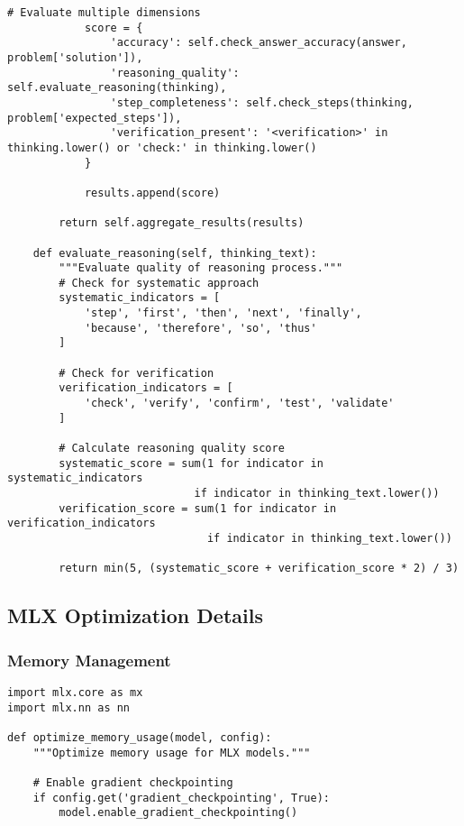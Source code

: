 \begin{table}[H]
\begin{lstlisting}[caption=Evaluation benchmark implementation,label=lst:benchmark-impl]
            # Evaluate multiple dimensions
            score = {
                'accuracy': self.check_answer_accuracy(answer, problem['solution']),
                'reasoning_quality': self.evaluate_reasoning(thinking),
                'step_completeness': self.check_steps(thinking, problem['expected_steps']),
                'verification_present': '<verification>' in thinking.lower() or 'check:' in thinking.lower()
            }
            
            results.append(score)
            
        return self.aggregate_results(results)
    
    def evaluate_reasoning(self, thinking_text):
        """Evaluate quality of reasoning process."""
        # Check for systematic approach
        systematic_indicators = [
            'step', 'first', 'then', 'next', 'finally',
            'because', 'therefore', 'so', 'thus'
        ]
        
        # Check for verification
        verification_indicators = [
            'check', 'verify', 'confirm', 'test', 'validate'
        ]
        
        # Calculate reasoning quality score
        systematic_score = sum(1 for indicator in systematic_indicators 
                             if indicator in thinking_text.lower())
        verification_score = sum(1 for indicator in verification_indicators 
                               if indicator in thinking_text.lower())
        
        return min(5, (systematic_score + verification_score * 2) / 3)
\end{lstlisting}

\subsection{MLX Optimization Details}

\subsubsection{Memory Management}

\begin{lstlisting}[caption=MLX memory optimization implementation,label=lst:mlx-memory]
import mlx.core as mx
import mlx.nn as nn

def optimize_memory_usage(model, config):
    """Optimize memory usage for MLX models."""
    
    # Enable gradient checkpointing
    if config.get('gradient_checkpointing', True):
        model.enable_gradient_checkpointing()
    

\end{lstlisting}
\end{table}
